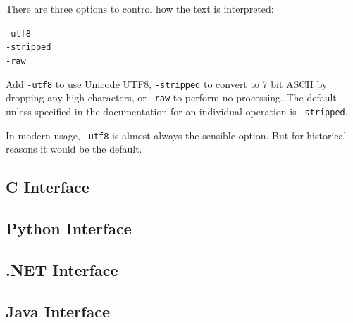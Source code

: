 \documentclass{book}
\begin{document}
\noindent There are three options to control how the text is interpreted:

\begin{framed}
  \noindent\small\verb!-utf8!\\
  \noindent\small\verb!-stripped!\\
  \noindent\small\verb!-raw!
\end{framed}

\noindent Add \verb!-utf8! to use Unicode UTF8, \verb!-stripped! to convert to 7
bit ASCII by dropping any high characters, or \verb!-raw! to perform no
processing. The default unless specified in the documentation for an individual operation is \verb!-stripped!.

In modern usage, \texttt{-utf8} is almost always the sensible option. But for historical reasons it would be the default.

\begin{cpdflib}
\clearpage
\section*{C Interface}
\begin{small}\tt


\end{small}
\end{cpdflib}

\begin{pycpdflib}
\clearpage
\section*{Python Interface}
\begin{small}\tt


\end{small}
\end{pycpdflib}

\begin{dotnetcpdflib}
\clearpage
\section*{.NET Interface}
\begin{small}\tt



\end{small}
\end{dotnetcpdflib}

\begin{jcpdflib}
\clearpage
\section*{Java Interface}
\begin{small}\tt




\end{small}
\end{jcpdflib}
\end{document}
